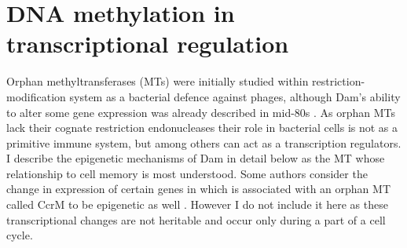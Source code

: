 
\section{DNA methylation in transcriptional regulation}
Orphan methyltransferases (MTs) were initially studied within restriction-modification system as a bacterial defence against phages, although Dam's ability to alter some gene expression was already described in mid-80s \cite{sternberg1985evidence, bickle1993biology}.
As orphan MTs lack their cognate restriction endonucleases their role in bacterial cells is not as a primitive immune system, but among others can act as a transcription regulators.
I describe the epigenetic mechanisms of Dam in detail below as the MT whose relationship to cell memory is most understood.
Some authors consider the change in expression of certain genes in  which is associated with an orphan MT called CcrM to be epigenetic as well \cite{casadesus2006epigenetic, adhikari2016dna}.
However I do not include it here as these transcriptional changes are not heritable and occur only during a part of a cell cycle.


